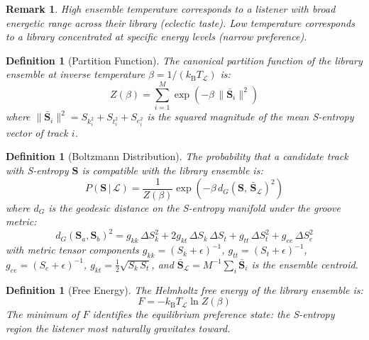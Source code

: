 \documentclass[11pt,twocolumn,a4paper]{article}
\newtheorem{definition}[theorem]{Definition}
\newtheorem{remark}[theorem]{Remark}
\newcommand{\kB}{k_{\mathrm{B}}}
\newcommand{\Sk}{S_k}
\newcommand{\St}{S_t}
\newcommand{\Se}{S_e}
\newcommand{\Lib}{\mathcal{L}}
\begin{document}
\begin{remark}
High ensemble temperature corresponds to a listener with broad
energetic range across their library (eclectic taste). Low temperature
corresponds to a library concentrated at specific energy levels (narrow
preference).
\end{remark}

\begin{definition}[Partition Function]
\label{def:partition-function}
The canonical partition function of the library ensemble at inverse
temperature $\beta = 1/(\kB T_{\Lib})$ is:
\begin{equation}
  Z(\beta) = \sum_{i=1}^{M}
  \exp\!\left(-\beta\, \|\bar{\mathbf{S}}_i\|^2\right)
  \label{eq:partition-function}
\end{equation}
where $\|\bar{\mathbf{S}}_i\|^2 = \Sk_i^2 + \St_i^2 + \Se_i^2$ is
the squared magnitude of the mean S-entropy vector of track $i$.
\end{definition}

\begin{definition}[Boltzmann Distribution]
\label{def:boltzmann}
The probability that a candidate track with S-entropy $\mathbf{S}$ is
compatible with the library ensemble is:
\begin{equation}
  P(\mathbf{S}\,|\,\Lib) = \frac{1}{Z(\beta)}
  \exp\!\left(-\beta\, d_G(\mathbf{S},\,
  \bar{\mathbf{S}}_{\Lib})^2\right)
  \label{eq:boltzmann}
\end{equation}
where $d_G$ is the geodesic distance on the S-entropy manifold under
the groove metric:
\begin{equation}
  d_G(\mathbf{S}_a, \mathbf{S}_b)^2 = g_{kk}\,\Delta\Sk^2
  + 2g_{kt}\,\Delta\Sk\,\Delta\St + g_{tt}\,\Delta\St^2
  + g_{ee}\,\Delta\Se^2
  \label{eq:geodesic}
\end{equation}
with metric tensor components $g_{kk} = (\Sk + \epsilon)^{-1}$,
$g_{tt} = (\St + \epsilon)^{-1}$, $g_{ee} = (\Se + \epsilon)^{-1}$,
$g_{kt} = \tfrac{1}{2}\sqrt{\Sk\,\St}$, and
$\bar{\mathbf{S}}_{\Lib} = M^{-1}\sum_i \bar{\mathbf{S}}_i$ is the
ensemble centroid.
\end{definition}

\begin{definition}[Free Energy]
\label{def:free-energy}
The Helmholtz free energy of the library ensemble is:
\begin{equation}
  F = -\kB T_{\Lib} \ln Z(\beta)
  \label{eq:free-energy}
\end{equation}
The minimum of $F$ identifies the equilibrium preference state: the
S-entropy region the listener most naturally gravitates toward.
\end{definition}
\end{document}

